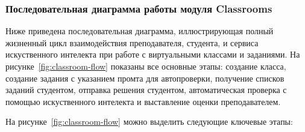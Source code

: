 \subsubsection{Последовательная диаграмма работы модуля Classrooms}
Ниже приведена последовательная диаграмма, иллюстрирующая полный жизненный цикл взаимодействия преподавателя, студента, и сервиса искуственного интелекта при работе с виртуальными классами и заданиями. На рисунке~\ref{fig:classroom-flow} показаны все основные этапы: создание класса, создание задания с указанием промта для автопроверки, получение списков заданий студентом, отправка решения студентом, автоматическая проверка с помощью искуственного интелекта и выставление оценки преподавателем.

На рисунке~\ref{fig:classroom-flow} можно выделить следующие ключевые этапы:

